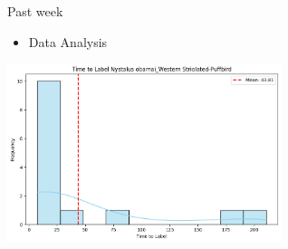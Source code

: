 





\begin{frame}{Past week}  
    \begin{itemize}
        \item Data Analysis
    \end{itemize}
    \centering
    \includegraphics[width=0.6\textwidth]{data analysis.png}  
\end{frame}


